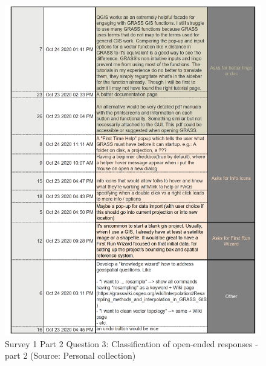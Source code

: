 \documentclass[a4paper,10pt,twoside]{article}
\begin{document}
\newpage
\vspace{0.3cm}
\begin{figure}[hbt!] 
\begin{center}
\includegraphics[width=16cm]{../surveys/analyzed_data/survey1_part2_question3_open_ended-2_3} 
\caption[Survey 1 Part 2 Question 3: Classification of open-ended responses - part 2]{Survey 1 Part 2 Question 3: Classification of open-ended responses - part 2 (Source: Personal collection)}
\label{fig:survey1_part2_question3_open_ended-2_1}
\end{center}
\end{figure}
\end{document}
